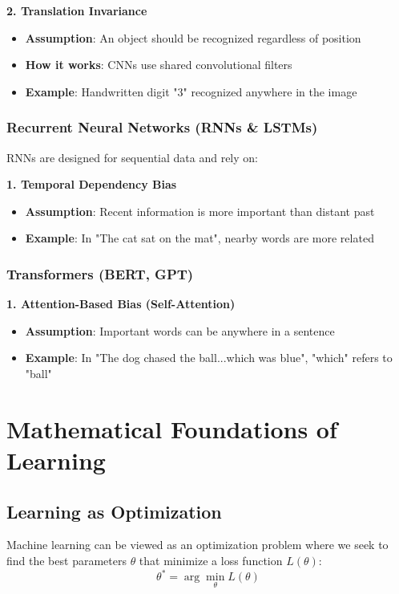 \textbf{2. Translation Invariance}
\begin{itemize}
    \item \textbf{Assumption}: An object should be recognized regardless of position
    \item \textbf{How it works}: CNNs use shared convolutional filters
    \item \textbf{Example}: Handwritten digit "3" recognized anywhere in the image
\end{itemize}

\subsubsection{Recurrent Neural Networks (RNNs \& LSTMs)}
RNNs are designed for sequential data and rely on:

\textbf{1. Temporal Dependency Bias}
\begin{itemize}
    \item \textbf{Assumption}: Recent information is more important than distant past
    \item \textbf{Example}: In "The cat sat on the mat", nearby words are more related
\end{itemize}

\subsubsection{Transformers (BERT, GPT)}

\textbf{1. Attention-Based Bias (Self-Attention)}
\begin{itemize}
    \item \textbf{Assumption}: Important words can be anywhere in a sentence
    \item \textbf{Example}: In "The dog chased the ball...which was blue", "which" refers to "ball"
\end{itemize}

\section{Mathematical Foundations of Learning}
\subsection{Learning as Optimization}
Machine learning can be viewed as an optimization problem where we seek to find the best parameters \(\theta\) that minimize a loss function \(L(\theta)\):
\[\theta^* = \arg\min_\theta L(\theta)\]

